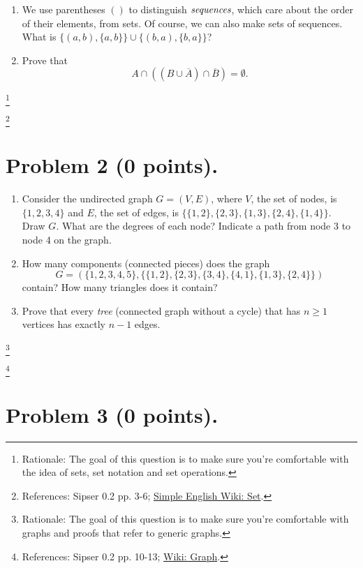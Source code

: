 \documentclass[letterpaper,11pt,twoside]{article}
\theoremstyle{plain}
\theoremstyle{definition}
\theoremstyle{remark}
\theoremstyle{restate}
\newcommand\blfootnote[1]{%
  \begingroup
  \renewcommand\thefootnote{}\footnote{#1}%
  \addtocounter{footnote}{-1}%
  \endgroup
}
\begin{document}
\begin{enumerate}
    \item We use parentheses $()$ to distinguish $\emph{sequences}$, which care about the order of their elements, from sets. Of course, we can also make sets of sequences. What is $\{(a, b), \{a, b\}\} \cup \{(b, a), \{b, a\}\}$?
    
    \item Prove that
    \[
        A \cap ((B \cup \overline{A}) \cap \overline{B} ) = \emptyset.
    \]

\end{enumerate}

\blfootnote{ Rationale: The goal of this question is to make sure you're comfortable with the idea of sets, set notation and set operations. }
\blfootnote{ References: Sipser 0.2 pp. 3-6; \href{https://simple.wikipedia.org/wiki/Set}{Simple English Wiki: Set}.}


\clearpage
\section{Problem 2 (0 points).}

\begin{enumerate}
    \item Consider the undirected graph $G = (V, E)$, where $V$, the set of nodes, is $\{1, 2, 3, 4\}$ and $E$, the set of edges, is $\{\{1, 2\}, \{2, 3\}, \{1, 3\}, \{2, 4\}, \{1, 4\}\}$. Draw $G$. What are the degrees of each node? Indicate a path from node 3 to node 4 on the graph.
    
    \item How many components (connected pieces) does the graph 
    \[
        G = (\{1, 2, 3, 4, 5\}, \{ \{1,2\}, \{2,3\}, \{3,4\}, \{4,1\}, \{1,3\}, \{2,4\}\})
    \]
    contain? How many triangles does it contain?
    
    \item Prove that every \emph{tree} (connected graph without a cycle) that has $n \geq 1$ vertices has exactly $n-1$ edges.

\end{enumerate}

\blfootnote{ Rationale: The goal of this question is to make sure you're comfortable with graphs and proofs that refer to generic graphs. }
\blfootnote{ References: Sipser 0.2 pp. 10-13; \href{https://en.wikipedia.org/wiki/Graph_(discrete_mathematics)}{Wiki: Graph}.}




\clearpage
\section{Problem 3 (0 points).}
\end{document}
